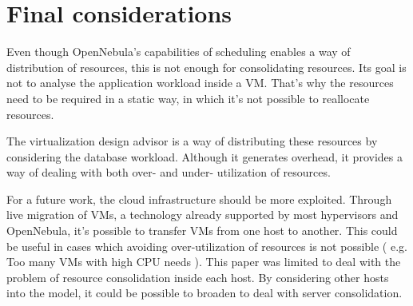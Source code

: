 \chapter{\textbf{Final considerations}}

Even though OpenNebula's capabilities of scheduling enables a way of distribution of resources, this is not enough for consolidating resources. Its goal is not to analyse the application workload inside a VM. That's why the resources need to be required in a static way, in which it's not possible to reallocate resources.

The virtualization design advisor is a way of distributing these resources by considering the database workload. Although it generates overhead, it provides a way of dealing with both over- and under- utilization of resources. 


For a future work, the cloud infrastructure should be more exploited. Through live migration of VMs, a technology already supported by most hypervisors and OpenNebula, it's possible to transfer VMs from one host to another. This could be useful in cases which avoiding over-utilization of resources is not possible ( e.g. Too many VMs with high CPU needs ). This paper was limited to deal with the problem of resource consolidation inside each host. By considering other hosts into the model, it could be possible to broaden to deal with server consolidation.